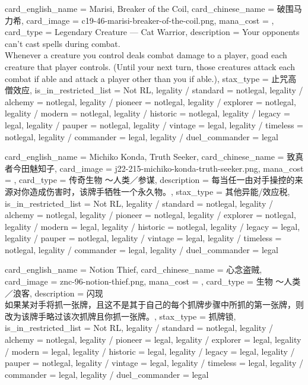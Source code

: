 \documentclass[lang = cn, color = black, 10pt]{AllThatStax}
\begin{document}
\card
{
	card_english_name = {Marisi, Breaker of the Coil},
	card_chinese_name = {破围马力希},
	card_image = c19-46-marisi-breaker-of-the-coil.png,
	mana_cost = ,
	card_type = Legendary Creature — Cat Warrior,
	description = {Your opponents can't cast spells during combat.\\
		Whenever a creature you control deals combat damage to a player, goad each creature that player controls. (Until your next turn, those creatures attack each combat if able and attack a player other than you if able.)},
	stax_type = 止咒高僧效应,
	is_in_restricted_list = Not RL,
	legality / standard = notlegal,
	legality / alchemy = notlegal,
	legality / pioneer = notlegal,
	legality / explorer = notlegal,
	legality / modern = notlegal,
	legality / historic = notlegal,
	legality / legacy = legal,
	legality / pauper = notlegal,
	legality / vintage = legal,
	legality / timeless = notlegal,
	legality / commander = legal,
	legality / duel_commander = legal
}

\card
{
	card_english_name = {Michiko Konda, Truth Seeker},
	card_chinese_name = {致真者今田魅知子},
	card_image = j22-215-michiko-konda-truth-seeker.png,
	mana_cost = ,
	card_type = 传奇生物 ～人类／参谋,
	description = {每当任一由对手操控的来源对你造成伤害时，该牌手牺牲一个永久物。},
	stax_type = 其他异能/效应税,
	is_in_restricted_list = Not RL,
	legality / standard = notlegal,
	legality / alchemy = notlegal,
	legality / pioneer = notlegal,
	legality / explorer = notlegal,
	legality / modern = legal,
	legality / historic = notlegal,
	legality / legacy = legal,
	legality / pauper = notlegal,
	legality / vintage = legal,
	legality / timeless = notlegal,
	legality / commander = legal,
	legality / duel_commander = legal
}

\card
{
	card_english_name = {Notion Thief},
	card_chinese_name = {心念盗贼},
	card_image = znc-96-notion-thief.png,
	mana_cost = ,
	card_type = 生物 ～人类／浪客,
	description = {闪现\\
		如果某对手将抓一张牌，且这不是其于自己的每个抓牌步骤中所抓的第一张牌，则改为该牌手略过该次抓牌且你抓一张牌。},
	stax_type = 抓牌锁,
	is_in_restricted_list = Not RL,
	legality / standard = notlegal,
	legality / alchemy = notlegal,
	legality / pioneer = legal,
	legality / explorer = legal,
	legality / modern = legal,
	legality / historic = legal,
	legality / legacy = legal,
	legality / pauper = notlegal,
	legality / vintage = legal,
	legality / timeless = legal,
	legality / commander = legal,
	legality / duel_commander = legal
}
\end{document}
